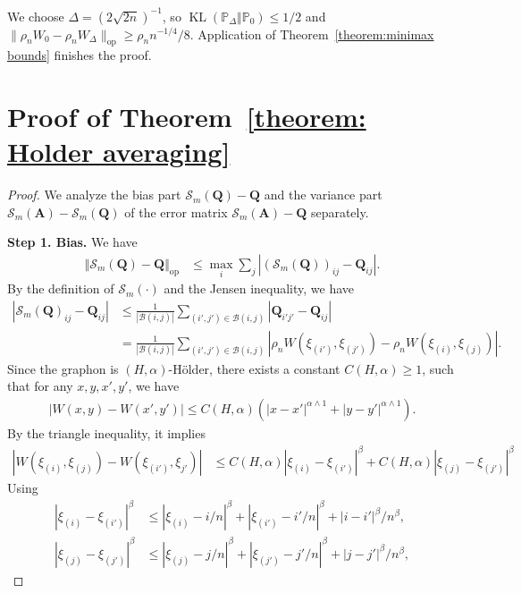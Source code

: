\documentclass[11pt]{article}
\renewcommand{\P}{\mathbb{P}}
\newcommand{\op}{\mathrm{op}}
\newcommand{\bA}{\bm{A}}
\newcommand{\bQ}{\bm{Q}}
\newcommand{\opnorm}[1]{\|#1\|_{\mathrm{op}}}
\newcommand{\cB}{\mathcal{B}}
\newcommand{\KL}[2]{\operatorname{KL}\left (#1\Vert #2 \right )}
\newcommand{\<}{\langle}
\renewcommand{\>}{\rangle}
\newcommand{\cS}{\mathcal{S}}
\theoremstyle{plain}
\theoremstyle{definition}
\theoremstyle{remark}
\begin{document}
{We choose $\Delta = ({2} \sqrt{2n})^{-1}$, so $\KL{\P_{\Delta}}{\P_0} \le 1/2$ and $\opnorm{\rho_n W_0 - \rho_n W_{\Delta}} \ge \rho_n n^{-1/4} / 8$. Application of Theorem~\ref{theorem:minimax bounds} finishes the proof.

\section{Proof of Theorem~\ref{theorem: Holder averaging}}
\label{section: upper bound proof - smooth graphons}

\begin{proof}
We analyze the bias part $\cS_m(\bQ) - \bQ$ and the variance  part $\cS_m(\bA) - \cS_m(\bQ)$ of the error matrix $\cS_m(\bA) - \bQ$ separately.

\noindent \textbf{Step 1. Bias.} We have
\begin{align}
    \Vert \cS_m(\bQ) - \bQ \Vert_{\op} & \le \max_i \sum_{j} |(\cS_m(\bQ))_{ij} - \bQ_{ij}|. \label{eq: L1 bound for bias}
\end{align}
By the definition of $\cS_m(\cdot)$ and the Jensen inequality, we have
\begin{align*}
     |\cS_m(\bQ)_{ij} - \bQ_{ij} | & \le \frac{1}{|\cB(i, j)|} \sum_{(i', j') \in \cB(i, j)} |\bQ_{i' j'} - \bQ_{i j}| \\
    & = \frac{1}{|\cB(i, j)|} \sum_{(i', j') \in \cB(i, j)} |\rho_n W(\xi_{(i')}, \xi_{(j')}) - \rho_n W(\xi_{(i)}, \xi_{(j)})|.
\end{align*}
Since the graphon is $(H, \alpha)$-H\"older, there exists a constant $C(H, \alpha) \ge 1$, such that for any $x, y, x', y'$, we have
\begin{align*}
    |W(x, y) - W(x', y')| \le C(H, \alpha) \left (|x - x'|^{\alpha \wedge 1} + |y - y'|^{\alpha \wedge 1} \right ).
\end{align*}
By the triangle inequality, it implies
\begin{align}
    |W(\xi_{(i)}, \xi_{(j)}) - W(\xi_{(i')}, \xi_{j'})| & \le C(H, \alpha) |\xi_{(i)} - \xi_{(i')}|^{\beta} + C(H, \alpha) |\xi_{(j)} - \xi_{(j')}|^{\beta} \nonumber
\end{align}
Using
\begin{align*}
    |\xi_{(i)} - \xi_{(i')}|^{\beta} & \le |\xi_{(i)} - i/n|^{\beta} + |\xi_{(i')} - i'/n|^\beta + |i - i'|^\beta / n^\beta, \\
    |\xi_{(j)} - \xi_{(j')}|^{\beta} & \le |\xi_{(j)} - j/n|^{\beta} + |\xi_{(j')} - j'/n|^\beta + |j - j'|^\beta / n^\beta, 
\end{align*}

\end{proof}}
\end{document}
